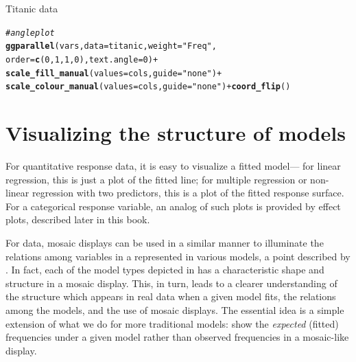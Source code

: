 \documentclass[11pt]{book}\usepackage[]{graphicx}\usepackage[]{color}
\makeatletter
\newcommand{\hlnum}[1]{\textcolor[rgb]{0.686,0.059,0.569}{#1}}%
\newcommand{\hlstr}[1]{\textcolor[rgb]{0.192,0.494,0.8}{#1}}%
\newcommand{\hlcom}[1]{\textcolor[rgb]{0.678,0.584,0.686}{\textit{#1}}}%
\newcommand{\hlopt}[1]{\textcolor[rgb]{0,0,0}{#1}}%
\newcommand{\hlstd}[1]{\textcolor[rgb]{0.345,0.345,0.345}{#1}}%
\newcommand{\hlkwc}[1]{\textcolor[rgb]{0.333,0.667,0.333}{#1}}%
\newcommand{\hlkwd}[1]{\textcolor[rgb]{0.737,0.353,0.396}{\textbf{#1}}}%
\newenvironment{kframe}{%
 \def\at@end@of@kframe{}%
 \ifinner\ifhmode%
  \def\at@end@of@kframe{\end{minipage}}%
  \begin{minipage}{\columnwidth}%
 \fi\fi%
 \def\FrameCommand##1{\hskip\@totalleftmargin \hskip-\fboxsep
 \colorbox{shadecolor}{##1}\hskip-\fboxsep
     \hskip-\linewidth \hskip-\@totalleftmargin \hskip\columnwidth}%
 \MakeFramed {\advance\hsize-\width
   \@totalleftmargin\z@ \linewidth\hsize
   \@setminipage}}%
 {\par\unskip\endMakeFramed%
 \at@end@of@kframe}
\newenvironment{knitrout}{}{} %
\renewenvironment{knitrout}{\small\renewcommand{\baselinestretch}{.85}}{} %
\makeatother
\begin{document}
\begin{Example}{Titanic data}
\begin{knitrout}
\begin{kframe}
{\ttfamily\noindent\bfseries{}}\end{kframe}
\end{knitrout}


\begin{knitrout}
\color{fgcolor}\begin{kframe}
\begin{alltt}
\hlcom{# angle plot}
\hlkwd{ggparallel}\hlstd{(vars,} \hlkwc{data}\hlstd{=titanic,} \hlkwc{weight}\hlstd{=}\hlstr{"Freq"}\hlstd{,}
           \hlkwc{order}\hlstd{=}\hlkwd{c}\hlstd{(}\hlnum{0}\hlstd{,}\hlnum{1}\hlstd{,}\hlnum{1}\hlstd{,}\hlnum{0}\hlstd{),} \hlkwc{text.angle}\hlstd{=}\hlnum{0}\hlstd{)} \hlopt{+}
  \hlkwd{scale_fill_manual}\hlstd{(}\hlkwc{values}\hlstd{=cols,} \hlkwc{guide}\hlstd{=}\hlstr{"none"}\hlstd{)} \hlopt{+}
  \hlkwd{scale_colour_manual}\hlstd{(}\hlkwc{values}\hlstd{=cols,} \hlkwc{guide}\hlstd{=}\hlstr{"none"}\hlstd{)} \hlopt{+} \hlkwd{coord_flip}\hlstd{()}
\end{alltt}


{\ttfamily\noindent\bfseries{}}\end{kframe}
\end{knitrout}



\end{Example}



\section{Visualizing the structure of \loglin models}\label{sec:mosaic-struc}
For quantitative response data, it is easy to visualize a fitted model---
for linear regression, this is just a plot of the fitted line;
for multiple regression or non-linear regression with two predictors,
this is a plot of the fitted response surface.  For a categorical
response variable, an analog of such plots is provided by
effect plots, described later in this book.

For \ctab data,
mosaic displays can be used in a similar manner to illuminate the relations among
variables in a \ctab represented in various \loglin{} models,
a point described by \citet{TheusLauer:99}.
In fact,
each of the model types depicted in  has
a characteristic shape and structure in a mosaic display. This,
in turn, leads to a clearer understanding of the structure which appears
in real data when a given model fits, the relations among the models,
and the use of mosaic displays.  The essential idea is a simple
extension of what we do for more traditional models:
show the \emph{expected} (fitted) frequencies under a given model
rather than observed frequencies in a mosaic-like display.
\end{document}
